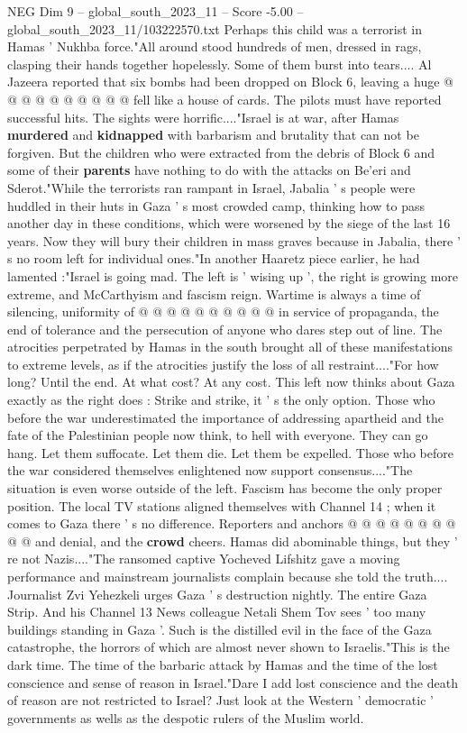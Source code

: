 \begin{textsample}{NEG Dim 9 – global\_south\_2023\_11 – Score -5.00 – global\_south\_2023\_11/103222570.txt}
Perhaps this child was a terrorist in Hamas ' Nukhba force."All around stood hundreds of men, dressed in rags, clasping their hands together hopelessly.
Some of them burst into tears....
Al Jazeera reported that six bombs had been dropped on Block 6, leaving a huge @ @ @ @ @ @ @ @ @ @ fell like a house of cards.
The pilots must have reported successful hits.
The sights were horrific...."Israel is at war, after Hamas \textbf{murdered} and \textbf{kidnapped} with barbarism and brutality that can not be forgiven.
But the children who were extracted from the debris of Block 6 and some of their \textbf{parents} have nothing to do with the attacks on Be'eri and Sderot."While the terrorists ran rampant in Israel, Jabalia ' s people were huddled in their huts in Gaza ' s most crowded camp, thinking how to pass another day in these conditions, which were worsened by the siege of the last 16 years.
Now they will bury their children in mass graves because in Jabalia, there ' s no room left for individual ones."In another Haaretz piece earlier, he had lamented :"Israel is going mad.
The left is ' wising up ', the right is growing more extreme, and McCarthyism and fascism reign.
Wartime is always a time of silencing, uniformity of @ @ @ @ @ @ @ @ @ @ in service of propaganda, the end of tolerance and the persecution of anyone who dares step out of line.
The atrocities perpetrated by Hamas in the south brought all of these manifestations to extreme levels, as if the atrocities justify the loss of all restraint...."For how long?
Until the end.
At what cost?
At any cost.
This left now thinks about Gaza exactly as the right does : Strike and strike, it ' s the only option.
Those who before the war underestimated the importance of addressing apartheid and the fate of the Palestinian people now think, to hell with everyone.
They can go hang.
Let them suffocate.
Let them die.
Let them be expelled.
Those who before the war considered themselves enlightened now support consensus...."The situation is even worse outside of the left.
Fascism has become the only proper position.
The local TV stations aligned themselves with Channel 14 ; when it comes to Gaza there ' s no difference.
Reporters and anchors @ @ @ @ @ @ @ @ @ @ and denial, and the \textbf{crowd} cheers.
Hamas did abominable things, but they ' re not Nazis...."The ransomed captive Yocheved Lifshitz gave a moving performance and mainstream journalists complain because she told the truth....
Journalist Zvi Yehezkeli urges Gaza ' s destruction nightly.
The entire Gaza Strip.
And his Channel 13 News colleague Netali Shem Tov sees ' too many buildings standing in Gaza '.
Such is the distilled evil in the face of the Gaza catastrophe, the horrors of which are almost never shown to Israelis."This is the dark time.
The time of the barbaric attack by Hamas and the time of the lost conscience and sense of reason in Israel."Dare I add lost conscience and the death of reason are not restricted to Israel?
Just look at the Western ' democratic ' governments as wells as the despotic rulers of the Muslim world.

\end{textsample}
